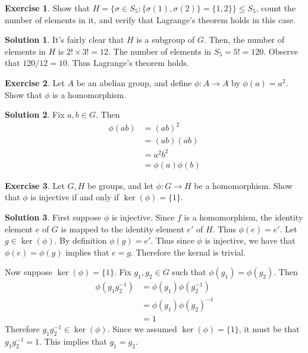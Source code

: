 \documentclass[12pt]{article}
\theoremstyle{definition}
\newtheorem{exercise}{\color{YellowOrange}Exercise}
\theoremstyle{definition}
\newtheorem{solution}{\color{Goldenrod}Solution}
\begin{document}
\begin{exercise}
Show that $H = \{\sigma \in S_5 : \{\sigma(1), \sigma(2) \} = \{1,2\} \} \leq S_5$, count the number of elements in it, and verify that Lagrange's theorem holds in this case.
\end{exercise}
\begin{solution}
It's fairly clear that $H$ is a subgroup of $G$. Then, the number of elements in $H$ is $2! \times 3! = 12$. The number of elements in $S_5 = 5! = 120$. Observe that $120 / 12 = 10$. Thus Lagrange's theorem holds. 
\end{solution}

\begin{exercise}
Let $A$ be an abelian group, and define $\phi : A \to A$ by $\phi(a) = a^2$. Show that $\phi$ is a homomorphism. 
\end{exercise}
\begin{solution}
Fix $a,b \in G$. Then
\begin{align*}
\phi(ab) &= (ab)^2 \\
&= (ab) (ab) \\
&= a^2 b^2 \tag{since $A$ is abelian} \\
&= \phi(a) \phi(b)
\end{align*}
\end{solution}

\begin{exercise}
Let $G, H$ be groups, and let $\phi : G \to H$ be a homomorphism. Show that $\phi$ is injective if and only if $\ker(\phi) = \{1\}$.
\end{exercise}
\begin{solution}
First suppose $\phi$ is injective. Since $f$ is a homomorphism, the identity element $e$ of $G$ is mapped to the identity element $e'$ of $H$. Thus $\phi(e) = e'$. Let $g \in \ker(\phi)$. By definition $\phi(g) = e'$. Thus since $\phi$ is injective, we have that $\phi(e) = \phi(g)$ implies that $e = g$. Therefore the kernal is trivial.

Now suppose $\ker(\phi) = \{1\}$. Fix $g_1, g_2 \in G$ such that $\phi(g_1) = \phi(g_2)$. Then
\begin{align*}
\phi(g_1 g_2^{-1}) &= \phi(g_1) \phi(g_2^{-1}) \tag{$\phi$ is a homomorphism}\\
&= \phi(g_1) \phi(g_2)^{-1} \tag{property of homomorphism} \\
&= 1
\end{align*} 
Therefore $g_1 g_2^{-1} \in \ker(\phi)$. Since we assumed $\ker(\phi) = \{1\}$, it must be that $g_1 g_2^{-1} = 1$. This implies that $g_1 = g_2$.
\end{solution}
\end{document}
